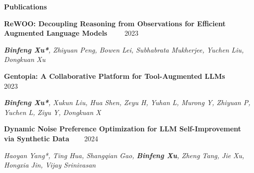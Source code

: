 \documentclass{resume} %
\begin{document}
\vspace{2mm}
\begin{rSection}{\Large \textbf{Publications}}

{\bf ReWOO: Decoupling Reasoning from Observations for Efficient Augmented Language Models} \ \ 
{{\href{https://arxiv.org/abs/2305.18323}{\faLink}}} \
{{\href{https://github.com/billxbf/ReWOO}{\faGithub}}} \hfill \textsc{2023}

\vspace{-1mm}
\textit{\textbf{Binfeng Xu*}, Zhiyuan Peng, Bowen Lei, Subhabrata Mukherjee, Yuchen Liu, Dongkuan Xu}


{\bf Gentopia: A Collaborative Platform for Tool-Augmented LLMs} \ \
{{\href{https://arxiv.org/abs/2308.04030}{\faLink}}} \ 
{{\href{https://github.com/Gentopia-AI/Gentopia}{\faGithub}}} \hfill \textsc{2023}

\vspace{-1mm}
\textit{\textbf{Binfeng Xu*}, Xukun Liu, Hua Shen, Zeyu H, Yuhan L, Murong Y, Zhiyuan P, Yuchen L, Ziyu Y, Dongkuan X}

{\bf Dynamic Noise Preference Optimization for LLM Self-Improvement via Synthetic Data} \ \
{{\href{https://openreview.net/forum?id=QdiMWcwU5w&referrer=%5Bthe%20profile%20of%20Binfeng%20Xu%5D(%2Fprofile%3Fid%3D~Binfeng_Xu1)}{\faLink}}} \  \hfill \textsc{2024}

\vspace{-1mm}
\textit{Haoyan Yang*, Ting Hua, Shangqian Gao, \textbf{Binfeng Xu}, Zheng Tang, Jie Xu, Hongxia Jin, Vijay Srinivasan }



\end{rSection}
\end{document}
